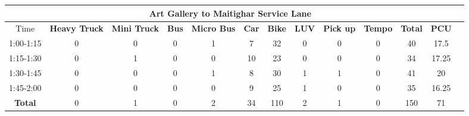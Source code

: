 \begin{landscape}
\begin{table}[h!]
\vspace{0.5cm}
\begin{tabular}{|c|c|c|c|c|c|c|c|c|c|c|c|c|}
    \hline
    \multicolumn{12}{|c|}{\textbf{Art Gallery to Maitighar Service Lane}} \\
    \hline
        Time & \textbf{Heavy Truck} & \textbf{Mini Truck} & \textbf{Bus} & \textbf{Micro Bus} & \textbf{Car} & \textbf{Bike} & \textbf{LUV} & \textbf{Pick up} & \textbf{Tempo} & \textbf{\textbf{Total}} & \textbf{PCU} \\
    \hline
1:00-1:15	&0	&0	&0	&1	&7	&32	&0	&0	&0	&40	&17.5 \\ \hline
1:15-1:30	&0	&1	&0	&0	&10	&23	&0	&0	&0	&34	&17.25 \\ \hline
1:30-1:45	&0	&0	&0	&1	&8	&30	&1	&1	&0	&41	&20 \\ \hline
1:45-2:00	&0	&0	&0	&0	&9	&25	&1	&0	&0	&35	&16.25 \\ \hline
\textbf{Total}	&0	&1	&0	&2	&34	&110	&2	&1	&0	&150	&71 \\ \hline

\end{tabular}

\end{table}
\end{landscape}


